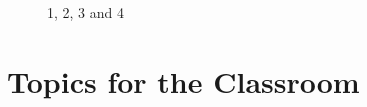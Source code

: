 \begin{figure}[H]
	\centering
	\begin{minipage}[b]{0.5\linewidth}
	\end{minipage}\hfill
	\begin{minipage}[b]{0.5\linewidth}
	\end{minipage}\hfill	
	\begin{minipage}[b]{0.5\linewidth}
	\end{minipage}\hfill
	\begin{minipage}[b]{0.5\linewidth}
	\end{minipage}\hfill
	\caption{1, 2, 3 and 4}
	\label{fig:Figure1}
\end{figure} 


\section{Topics for the Classroom}

\begin{enumerate}
\end{enumerate}



\begin{thebibliography}{00}

\end{thebibliography}


